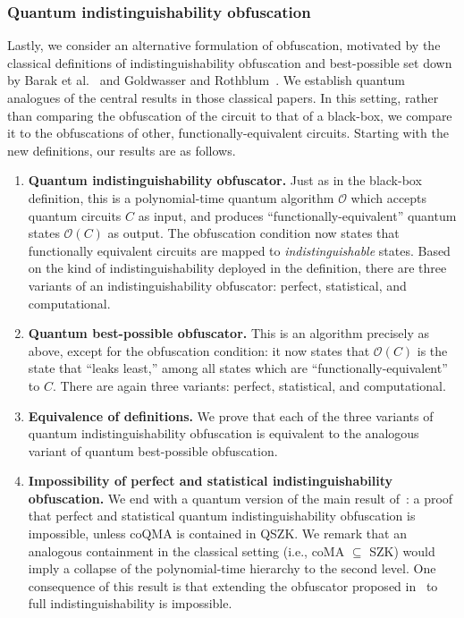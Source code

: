 \documentclass[11pt]{article}
\numberwithin{equation}{section}
\newcommand{\algo}{\mathcal}
\begin{document}
{\subsubsection{Quantum indistinguishability obfuscation}

Lastly, we consider an alternative formulation of obfuscation, motivated by the classical definitions of indistinguishability obfuscation and best-possible set down by Barak et al.~\cite{BGIRSVY12} and Goldwasser and Rothblum~\cite{GR07}. We establish quantum analogues of the central results in those classical papers. In this setting, rather than comparing the obfuscation of the circuit to that of a black-box, we compare it to the obfuscations of other, functionally-equivalent circuits. Starting with the new definitions, our results are as follows.

\begin{enumerate}
\item \textbf{Quantum indistinguishability obfuscator.} Just as in the black-box definition, this is a polynomial-time quantum algorithm $\algo O$ which accepts quantum circuits $C$ as input, and produces ``functionally-equivalent'' quantum states $\algo O(C)$ as output. The obfuscation condition now states that functionally equivalent circuits are mapped to \emph{indistinguishable} states. Based on the kind of indistinguishability deployed in the definition, there are three variants of an indistinguishability obfuscator: perfect, statistical, and computational.
\item \textbf{Quantum best-possible obfuscator.} This is an algorithm precisely as above, except for the obfuscation condition: it now states that $\algo O(C)$ is the state that ``leaks least,'' among all states which are ``functionally-equivalent'' to $C$. There are again three variants: perfect, statistical, and computational.
\item \textbf{Equivalence of definitions.} We prove that each of the three variants of quantum indistinguishability obfuscation is equivalent to the analogous variant of quantum best-possible obfuscation.
\item \textbf{Impossibility of perfect and statistical indistinguishability obfuscation.} We end with a quantum version of the main result of~\cite{GR07}: a proof that perfect and statistical quantum indistinguishability obfuscation is impossible, unless coQMA is contained in QSZK. We remark that an analogous containment in the classical setting (i.e., coMA $\subseteq$ SZK) would imply a collapse of the polynomial-time hierarchy to the second level. One consequence of this result is that extending the obfuscator proposed in~\cite{ASS14} to full indistinguishability is impossible.

\end{enumerate}}
\end{document}

